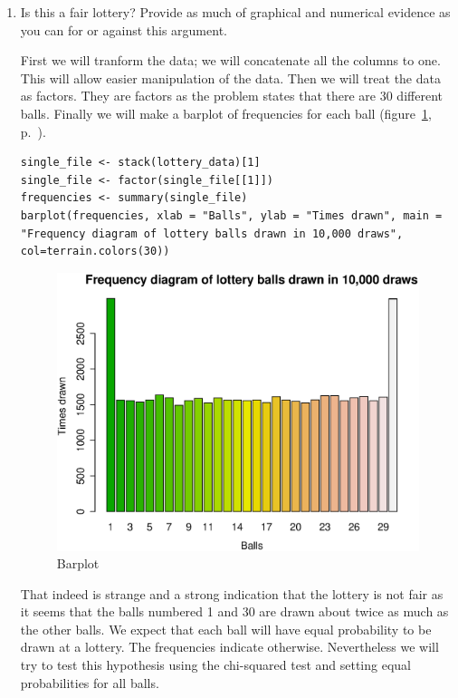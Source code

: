 \documentclass{article}
\begin{document}
\begin{enumerate}
  \item Is this a fair lottery?  Provide as much of graphical and numerical
  evidence as you can for or against this argument.
  
  First we will tranform the data; we will concatenate all the columns to one.
  This will allow easier manipulation of the data. Then we will treat the data
  as factors. They are factors as the problem states that there are 30 different
  balls. Finally we will make a barplot of frequencies for each ball
  (figure~\ref{fig:barplot}, p.~\pageref{fig:barplot}).
  
  \begin{lstlisting}
single_file <- stack(lottery_data)[1]
single_file <- factor(single_file[[1]])
frequencies <- summary(single_file)
barplot(frequencies, xlab = "Balls", ylab = "Times drawn", main = "Frequency diagram of lottery balls drawn in 10,000 draws", col=terrain.colors(30))
  \end{lstlisting}
    
  \begin{figure}[H]
  \centering
  \includegraphics[scale=0.6]{barplot.eps}
  \caption{Barplot}
  \label{fig:barplot}
  \end{figure}
  
  
  That indeed is strange and a strong indication that the lottery is not fair as
  it seems that the balls numbered 1 and 30 are drawn about twice as much as the
  other balls.
  We expect that each ball will have equal probability to be drawn at a lottery.
  The frequencies indicate otherwise. Nevertheless we will try to test this
  hypothesis using the chi-squared test and setting equal probabilities for all
  balls.
  

\end{enumerate}
\end{document}
